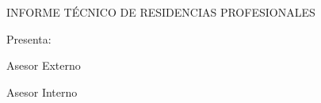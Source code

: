 \begin{titlepage}
\begin{center}
\begin{minipage}{0.25\textwidth}
\begin{flushright}
            \end{flushright}
        \end{minipage}
        
        \vspace{0.8cm}
        \MakeUppercase{Informe técnico de residencias profesionales}

        \nombreProyecto{}

        \vspace{0.8cm}
        \fechaInicioResidencia{} \textendash{} \fechaFinResidencia{}

        \nombreEmpresa{}

        \vspace{0.8cm}
        Presenta:

        \nombreAutor{}

        \numeroControl{}

        \especialidad{}

        \vspace{0.8cm}
        Asesor Externo

        \nombreAsesorExterno{}

        \vspace{0.8cm}
        Asesor Interno

        \nombreAsesorInterno{}

        \vspace{0.8cm}
        \fechaPresentacion{}
    \end{center}
\end{titlepage}